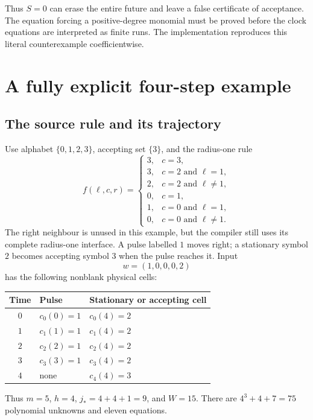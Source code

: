 \documentclass[11pt,letterpaper]{article}
\numberwithin{equation}{section}
\theoremstyle{definition}
\begin{document}
Thus $S=0$ can erase the entire future and leave a false certificate of
acceptance. The equation forcing a positive-degree monomial must be
proved before the clock equations are interpreted as finite runs.
The implementation reproduces this literal counterexample coefficientwise.

\section{A fully explicit four-step example}
\label{pwh:oc:sec:example}

\subsection{The source rule and its trajectory}

Use alphabet $\{0,1,2,3\}$, accepting set $\{3\}$, and the radius-one
rule
\begin{equation}
 f(\ell,c,r)=
 \begin{cases}
 3,&c=3,\\
 3,&c=2\text{ and }\ell=1,\\
 2,&c=2\text{ and }\ell\ne1,\\
 0,&c=1,\\
 1,&c=0\text{ and }\ell=1,\\
 0,&c=0\text{ and }\ell\ne1.
 \end{cases}
 \label{pwh:oc:eq:example-rule}
\end{equation}
The right neighbour is unused in this example, but the compiler still
uses its complete radius-one interface. A pulse labelled $1$ moves right;
a stationary symbol $2$ becomes accepting symbol $3$ when the pulse
reaches it. Input
\[
 w=(1,0,0,0,2)
\]
has the following nonblank physical cells:
\begin{center}
\begin{tabular}{@{}cll@{}}
\toprule
Time & Pulse & Stationary or accepting cell\\
\midrule
$0$ & $c_0(0)=1$ & $c_0(4)=2$\\
$1$ & $c_1(1)=1$ & $c_1(4)=2$\\
$2$ & $c_2(2)=1$ & $c_2(4)=2$\\
$3$ & $c_3(3)=1$ & $c_3(4)=2$\\
$4$ & none & $c_4(4)=3$\\
\bottomrule
\end{tabular}
\end{center}
Thus $m=5$, $h=4$, $j_*=4+4+1=9$, and $W=15$.
There are $4^3+4+7=75$ polynomial unknowns and eleven equations.
\end{document}
